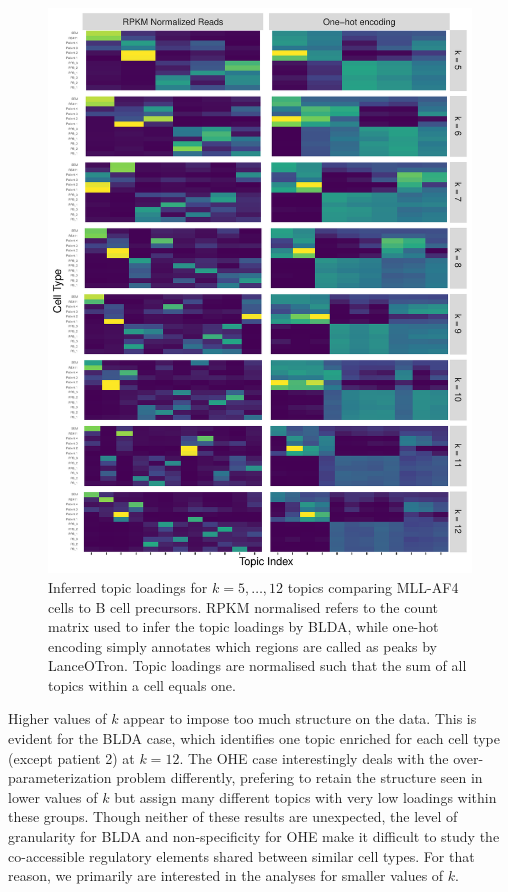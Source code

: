 \begin{figure}
    \centering
    \includegraphics[width=\textwidth]{plot/ch5/mll_redo_topic_mtx.pdf}
    \caption{Inferred topic loadings for $k = 5, \ldots, 12$ topics comparing MLL-AF4 cells to B cell precursors. RPKM normalised refers to the count matrix used to infer the topic loadings by BLDA, while one-hot encoding simply annotates which regions are called as peaks by LanceOTron. Topic loadings are normalised such that the sum of all topics within a cell equals one.}
    \label{fig:mll_all_topic}
\end{figure}

Higher values of $k$ appear to impose too much structure on the data. This is evident for the BLDA case, which identifies one topic enriched for each cell type (except patient 2) at $k=12$. The OHE case interestingly deals with the over-parameterization problem differently, prefering to retain the structure seen in lower values of $k$ but assign many different topics with very low loadings within these groups. Though neither of these results are unexpected, the level of granularity for BLDA and non-specificity for OHE make it difficult to study the co-accessible regulatory elements shared between similar cell types. For that reason, we primarily are interested in the analyses for smaller values of $k$.

